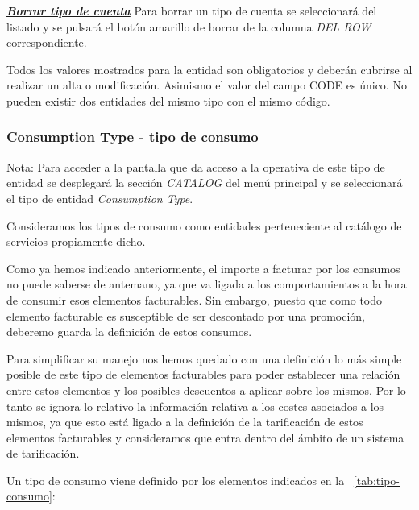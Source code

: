 \underline{\textsl{\textbf{Borrar tipo de cuenta}}}\newline
Para borrar un tipo de cuenta se seleccionará del listado y se pulsará el botón amarillo de borrar de la columna \textit{DEL ROW} correspondiente.\newline

Todos los valores mostrados para la entidad son obligatorios y deberán cubrirse al realizar un alta o modificación. Asimismo el valor del campo CODE es único. No pueden existir dos entidades del mismo tipo con el mismo código.




\subsubsection{Consumption Type - tipo de consumo}
\label{sub:consumption-type}

Nota: Para acceder a la pantalla que da acceso a la operativa de este tipo de entidad se desplegará la sección \emph{CATALOG} del menú principal y se seleccionará el tipo de entidad \emph{Consumption Type}.

Consideramos los tipos de consumo como entidades perteneciente al catálogo de servicios propiamente dicho.

Como ya hemos indicado anteriormente, el importe a facturar por los consumos no puede saberse de antemano, ya que va ligada a los comportamientos a la hora de consumir esos elementos facturables. Sin embargo, puesto que como todo elemento facturable es susceptible de ser descontado por una promoción, deberemo guarda la definición de estos consumos.

Para simplificar su manejo nos hemos quedado con una definición lo más simple posible de este tipo de elementos facturables para poder establecer una relación entre estos elementos y los posibles descuentos a aplicar sobre los mismos. Por lo tanto se ignora lo relativo la información relativa a los costes asociados a los mismos, ya que esto está ligado a la definición de la tarificación de estos elementos facturables y consideramos que entra dentro del ámbito de un sistema de tarificación. 

Un tipo de consumo viene definido por los elementos indicados en la \tablename~\ref{tab:tipo-consumo}:



